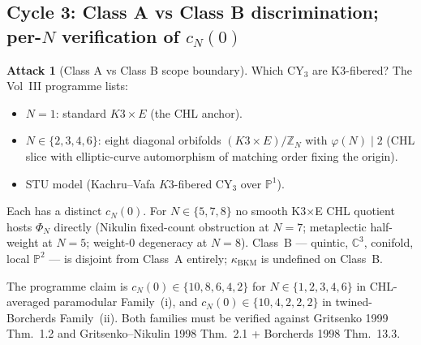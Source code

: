 \documentclass[11pt]{article}
\theoremstyle{definition}
\newtheorem{attack}[theorem]{Attack}
\newcommand{\kBKM}{\kappa_{\mathrm{BKM}}}
\begin{document}
\subsection{Cycle 3: Class A vs Class B discrimination; per-$N$ verification of $c_N(0)$}

\begin{attack}[Class A vs Class B scope boundary]
Which CY$_3$ are K3-fibered? The Vol~III programme lists:
\begin{itemize}
\item $N = 1$: standard $K3 \times E$ (the CHL anchor).
\item $N \in \{2, 3, 4, 6\}$: eight diagonal orbifolds $(K3 \times E)/\mathbb{Z}_N$
with $\varphi(N) \mid 2$ (CHL slice with elliptic-curve automorphism of
matching order fixing the origin).
\item STU model (Kachru--Vafa $K3$-fibered CY$_3$ over $\mathbb{P}^1$).
\end{itemize}
Each has a distinct $c_N(0)$. For $N \in \{5, 7, 8\}$ no smooth K3$\times$E
CHL quotient hosts $\Phi_N$ directly (Nikulin fixed-count obstruction at
$N = 7$; metaplectic half-weight at $N = 5$; weight-$0$ degeneracy at
$N = 8$). Class~B --- quintic, $\mathbb{C}^3$, conifold, local $\mathbb{P}^2$
--- is disjoint from Class~A entirely; $\kBKM$ is undefined on Class~B.

The programme claim is $c_N(0) \in \{10, 8, 6, 4, 2\}$ for $N \in
\{1, 2, 3, 4, 6\}$ in CHL-averaged paramodular Family~(i), and
$c_N(0) \in \{10, 4, 2, 2, 2\}$ in twined-Borcherds Family~(ii). Both
families must be verified against Gritsenko 1999 Thm.~1.2 and
Gritsenko--Nikulin 1998 Thm.~2.1 + Borcherds 1998 Thm.~13.3.
\end{attack}
\end{document}
